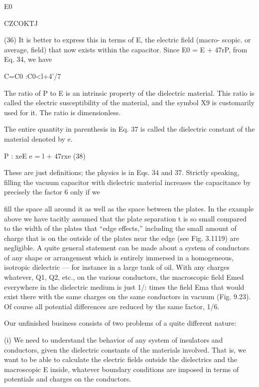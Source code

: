 \begin{equation}
\end{equation}
E0

CZCOKTJ

(36)
It is better to express this in terms of E, the electric field (macro-
scopic. or average, field) that now exists within the capacitor. Since
E0 = E + 47rP, from Eq. 34, we have

\begin{equation}
\end{equation}
C=C0 :C0<l+4'/7%

The ratio of P to E is an intrinsic property of the dielectric material.
This ratio is called the electric susceptibility of the material, and the
symbol X9 is customarily used for it. The ratio is dimensionless.

The entire quantity in parenthesis in Eq. 37 is called the dielectric
constant of the material denoted by e.

\begin{equation}
\end{equation}
P : xeE e = l + 47rxe (38)

These are just definitions; the physics is in Eqs. 34 and 37.
Strictly speaking, filling the vacuum capacitor with dielectric material
increases the capacitance by precisely the factor 6 only if we

fill the space all around it as well as the space between the plates.
In the example above we have tacitly assumed that the plate separation
t is so small compared to the width of the plates that ``edge
effects,'' including the small amount of charge that is on the outside
of the plates near the edge (see Fig. 3.1119) are negligible. A quite
general statement can be made about a system of conductors of any
shape or arrangement which is entirely immersed in a homogeneous,
isotropic dielectric --- for instance in a large tank of oil. With any
charges whatever, Q1, Q2, etc., on the various conductors, the macroscopic
field Emed everywhere in the dielectric medium is just 1/: times
the field Ema that would exist there with the same charges on the
same conductors in vacuum (Fig. 9.23). Of course all potential
differences are reduced by the same factor, 1/6.

Our unfinished business consists of two problems of a quite different
nature:

(i) We need to understand the behavior of any system of insulators
and conductors, given the dielectric constants of the
materials involved. That is, we want to be able to calculate
the electric fields outside the dielectrics and the macroscopic
E inside, whatever boundary conditions are imposed
in terms of potentials and charges on the conductors.

